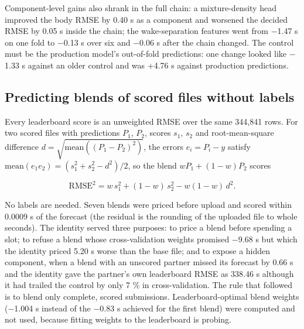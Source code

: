 \documentclass[
  manuscript=article,  %
  layout=preprint,     %
  year=2026,
  volume=4,
]{extra/joas}
\begin{document}
Component-level gains also shrank in the full chain: a mixture-density head improved the body RMSE by 0.40 s as a component and worsened the decided RMSE by 0.05 s inside the chain; the wake-separation features went from $-$1.47 s on one fold to $-$0.13 s over six and $-$0.06 s after the chain changed. The control must be the production model's out-of-fold predictions: one change looked like $-$1.33 s against an older control and was +4.76 s against production predictions.

\subsection{Predicting blends of scored files without labels}\label{predicting-blends-of-scored-files-without-labels}

Every leaderboard score is an unweighted RMSE over the same 344,841 rows. For two scored files with predictions \(P_1\), \(P_2\), scores \(s_1\), \(s_2\) and root-mean-square difference \(d = \sqrt{\mathrm{mean}((P_1 - P_2)^2)}\), the errors \(e_i = P_i - y\) satisfy \(\mathrm{mean}(e_1 e_2) = (s_1^2 + s_2^2 - d^2)/2\), so the blend \(wP_1 + (1-w)P_2\) scores

\begin{equation}\mathrm{RMSE}^2 = w\,s_1^2 + (1-w)\,s_2^2 - w(1-w)\,d^2 .\end{equation}

No labels are needed. Seven blends were priced before upload and scored within 0.0009 s of the forecast (the residual is the rounding of the uploaded file to whole seconds). The identity served three purposes: to price a blend before spending a slot; to refuse a blend whose cross-validation weights promised $-$9.68 s but which the identity priced 5.20 s worse than the base file; and to expose a hidden component, when a blend with an unscored partner missed its forecast by 0.66 s and the identity gave the partner's own leaderboard RMSE as 338.46 s although it had trailed the control by only 7 \% in cross-validation. The rule that followed is to blend only complete, scored submissions. Leaderboard-optimal blend weights ($-$1.004 s instead of the $-$0.83 s achieved for the first blend) were computed and not used, because fitting weights to the leaderboard is probing.
\end{document}
